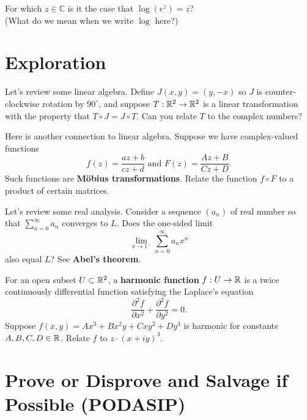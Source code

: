 \documentclass{homework}
\begin{document}
\begin{problem}
  For which $z \in \mathbb{C}$ is it the case that $\log \left( e^z \right) = z$?  \\ (What do we mean when we write $\log$ here?)
\end{problem}

\section{Exploration}

\begin{problem}
  Let's review some linear algebra.  Define $J(x,y) = (y,-x)$ so $J$
  is counter-clockwise rotation by $90^\circ$, and suppose
  $T : \mathbb{R}^2 \to \mathbb{R}^2$ is a linear transformation with the property
  that $T \circ J = J \circ T$.  Can you relate $T$ to the complex
  numbers?
\end{problem}

\begin{problem}\label{mobius-transformations}Here is another connection to linear algebra.  Suppose we have complex-valued functions
  \[
    f(z) = \frac{az + b}{cz + d} \mbox{ and }
    F(z) = \frac{Az + B}{Cz + D}.
  \]
  Such functions are \textbf{M\"obius transformations}.  Relate the
  function $f \circ F$ to a product of certain matrices.
\end{problem}

\begin{problem}\label{abels-theorem}Let's review some real analysis.  Consider a sequence $(a_n)$ of real number so that $\sum_{n=0}^\infty a_n$ converges to $L$.  Does the one-sided limit
  \[
    \lim_{x \to 1^{-}} \sum_{n=0}^\infty a_n x^n
  \]
  also equal $L$?  See \textbf{Abel's theorem}.
\end{problem}

\begin{problem}
  For an open subset $U \subset \mathbb{R}^2$, a \textbf{harmonic function} $f : U \to \mathbb{R}$ is a twice continuously differential function satisfying the Laplace's equation
  \[
    \frac{\partial^2 f}{\partial x^2} + \frac{\partial^2 f}{\partial y^2} = 0.
  \]
  Suppose $f(x,y) = Ax^3 + Bx^2 y + C xy^2 + D y^3$ is harmonic for constants $A, B, C, D \in \mathbb{R}$.  Relate $f$ to $z \cdot (x + iy)^3$.
\end{problem}

\section{Prove or Disprove and Salvage if Possible (PODASIP)}
\end{document}
